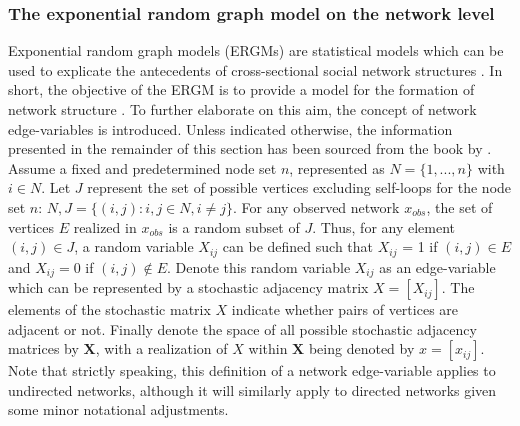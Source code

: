 \documentclass[a4paper, man]{apa6}
\begin{document}
\subsubsection{The exponential random graph model on the network level} Exponential random graph models (ERGMs) are statistical models which can be used to explicate the antecedents of cross-sectional social network structures \cite{lusher2013exponential}. In short, the objective of the ERGM is to provide a model for the formation of network structure \cite{lusher2013exponential}. To further elaborate on this aim, the concept of network edge-variables is introduced. Unless indicated otherwise, the information presented in the remainder of this section has been sourced from the book by . Assume a fixed and predetermined node set $n$, represented as $N = \{1, ..., n\}$ with $i \in N$. Let $J$ represent the set of possible vertices excluding self-loops for the node set $n$: $N, J = \{(i, j): i, j \in N, i \neq j\}$. For any observed network $x_{obs}$, the set of vertices $E$ realized in $x_{obs}$ is a random subset of $J$. Thus, for any element $(i, j) \in J$, a random variable $X_{ij}$ can be defined such that $X_{ij}$ = 1 if $(i, j) \in E$ and $X_{ij} = 0$ if $(i, j) \not\in E$. \clearpage \noindent Denote this random variable $X_{ij}$ as an edge-variable which can be represented by a stochastic adjacency matrix $X = [X_{ij}]$. The elements of the stochastic matrix $X$ indicate whether pairs of vertices are adjacent or not. Finally denote the space of all possible stochastic adjacency matrices by $\textbf{X}$, with a realization of $X$ within $\textbf{X}$ being denoted by $x = [x_{ij}]$. Note that strictly speaking, this definition of a network edge-variable applies to undirected networks, although it will similarly apply to directed networks given some minor notational adjustments.
\\
\end{document}
